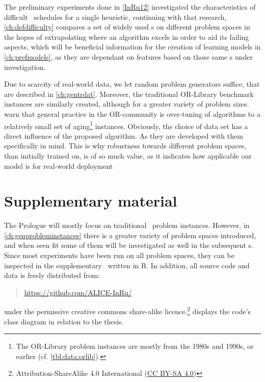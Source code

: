 The preliminary experiments done in \cref{InRu12} investigated the 
characteristics of difficult \jsp\ schedules for a single heuristic, continuing 
with that research, \cref{ch:defdifficulty} compares a set of widely used 
\dr s on different problem spaces in the hopes of extrapolating 
where an algorithm excels in order to aid its failing aspects, which will be 
beneficial information for the creation of learning models in 
\cref{ch:prefmodels}, as they are dependant  on features based on those same 
\dr s under investigation.

Due to scarcity of real-world data, we let random problem generators 
suffice, that are described in \cref{ch:gentrdat}. Moreover, the traditional 
OR-Library benchmark instances are similarly created, although for a greater 
variety of problem sizes. 
\citet{SmithMiles2015} warn that general practice in the OR-community is 
over-tuning of algorithms to a relatively small set of aging\footnote{
    The OR-Library problem instances are mostly from the 1980s and 
    1990s, or earlier (cf. \cref{tbl:data:orlib}).}
instances. 
Obviously, the choice of data set has a direct influence of the proposed 
algorithm. As they are developed with them specifically in mind. 
This is why robustness towards different problem spaces, than initially trained 
on, is of so much value, as it indicates how applicable our model is for 
real-world deployment 


\section{Supplementary material}
The Prologue will mostly focus on traditional \jsp\ problem instances. 
However, in \cref{ch:genprobleminstances} there is a greater variety of problem 
spaces introduced, and when seen fit some of them will be investigated as well 
in the subsequent s. 
Since most experiments have been run on all problem spaces, they can be 
inspected in the supplementary \shiny\ written in R. 
In addition, all source code and data is freely distributed from:
\begin{quote}
    \url{https://github.com/ALICE-InRu/}
\end{quote}
under the permissive creative commons share-alike 
licence.\footnote{Attribution-ShareAlike 4.0 International 
    (\href{http://creativecommons.org/licenses/by-sa/4.0/}{CC BY-SA 4.0})}
 displays the code's class diagram in relation to the 
thesis.



